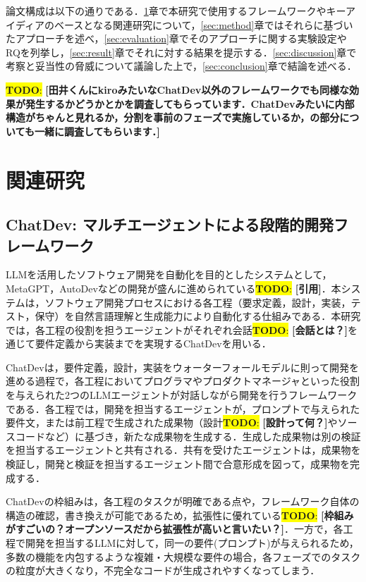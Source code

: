 \documentclass[submit,techrep,noauthor]{ipsj}
\newcommand{\todo}[1]{\colorbox{yellow}{{\bf TODO}:}{\color{red} {\textbf{[#1]}}}}
\begin{document}
論文構成は以下の通りである．\ref{sec:related}章で本研究で使用するフレームワークやキーアイディアのベースとなる関連研究について，\ref{sec:method}章ではそれらに基づいたアプローチを述べ，\ref{sec:evaluation}章でそのアプローチに関する実験設定やRQを列挙し，\ref{sec:result}章でそれに対する結果を提示する．\ref{sec:discussion}章で考察と妥当性の脅威について議論した上で，\ref{sec:conclusion}章で結論を述べる．

\todo{田井くんにkiroみたいなChatDev以外のフレームワークでも同様な効果が発生するかどうかとかを調査してもらっています．ChatDevみたいに内部構造がちゃんと見れるか，分割を事前のフェーズで実施しているか，の部分についても一緒に調査してもらいます．}


\section{関連研究}
\label{sec:related}

\subsection{ChatDev: マルチエージェントによる段階的開発フレームワーク}
LLMを活用したソフトウェア開発を自動化を目的としたシステムとして，MetaGPT，AutoDevなどの開発が盛んに進められている\todo{引用}．本システムは，ソフトウェア開発プロセスにおける各工程（要求定義，設計，実装，テスト，保守）を自然言語理解と生成能力により自動化する仕組みである．本研究では，各工程の役割を担うエージェントがそれぞれ会話\todo{会話とは？}を通じて要件定義から実装までを実現するChatDev\cite{qian-etal-2024-chatdev}を用いる．

ChatDevは，要件定義，設計，実装をウォーターフォールモデルに則って開発を進める過程で，各工程においてプログラマやプロダクトマネージャといった役割を与えられた2つのLLMエージェントが対話しながら開発を行うフレームワークである．各工程では，開発を担当するエージェントが，プロンプトで与えられた要件文，または前工程で生成された成果物（設計\todo{設計って何？}やソースコードなど）に基づき，新たな成果物を生成する．生成した成果物は別の検証を担当するエージェントと共有される．共有を受けたエージェントは，成果物を検証し，開発と検証を担当するエージェント間で合意形成を図って，成果物を完成する．

ChatDevの枠組みは，各工程のタスクが明確である点や，フレームワーク自体の構造の確認，書き換えが可能であるため，拡張性に優れている\todo{枠組みがすごいの？オープンソースだから拡張性が高いと言いたい？}．一方で，各工程で開発を担当するLLMに対して，同一の要件(プロンプト)が与えられるため，多数の機能を内包するような複雑・大規模な要件の場合，各フェーズでのタスクの粒度が大きくなり，不完全なコードが生成されやすくなってしまう．
\end{document}
